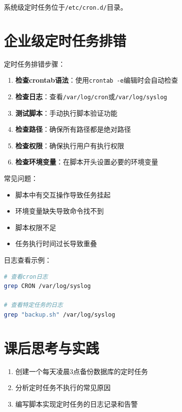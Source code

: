 \documentclass[12pt,UTF8]{ctexbook}
\begin{document}
系统级定时任务位于\texttt{/etc/cron.d/}目录。

\section{企业级定时任务排错}
\label{sec:cron-troubleshooting}

定时任务排错步骤：

\begin{enumerate}
    \item \textbf{检查crontab语法}：使用\texttt{crontab -e}编辑时会自动检查
    \item \textbf{检查日志}：查看\texttt{/var/log/cron}或\texttt{/var/log/syslog}
    \item \textbf{测试脚本}：手动执行脚本验证功能
    \item \textbf{检查路径}：确保所有路径都是绝对路径
    \item \textbf{检查权限}：确保执行用户有执行权限
    \item \textbf{检查环境变量}：在脚本开头设置必要的环境变量
\end{enumerate}

常见问题：
\begin{itemize}
    \item 脚本中有交互操作导致任务挂起
    \item 环境变量缺失导致命令找不到
    \item 脚本权限不足
    \item 任务执行时间过长导致重叠
\end{itemize}

日志查看示例：
\begin{lstlisting}[language=bash]
# 查看cron日志
grep CRON /var/log/syslog

# 查看特定任务的日志
grep "backup.sh" /var/log/syslog
\end{lstlisting}

\section{课后思考与实践}
\label{sec:cron-practice}
\begin{enumerate}
    \item 创建一个每天凌晨3点备份数据库的定时任务
    \item 分析定时任务不执行的常见原因
    \item 编写脚本实现定时任务的日志记录和告警
\end{enumerate}
\end{document}
